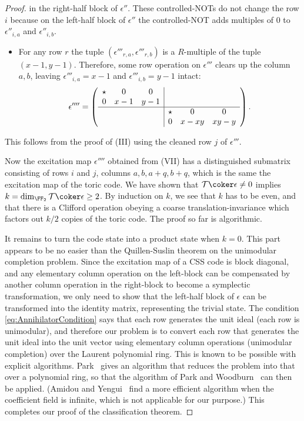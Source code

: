 \begin{proof}
in the right-half block of $\epsilon''$.
These controlled-NOTs do not change the row $i$ because on the left-half block of $\epsilon''$
the controlled-NOT adds multiples of 0 to $\epsilon''_{i,a}$ and $\epsilon''_{i,b}$.
\begin{itemize}
 \item [(VII)] For any row $r$ the tuple $(\epsilon'''_{r,a},\epsilon'''_{r,b})$ is a $R$-multiple
 of the tuple $(x-1,y-1)$. Therefore, some row operation on $\epsilon'''$ clears up the column $a,b$,
 leaving $\epsilon'''_{i,a} = x-1$ and $\epsilon'''_{i,b} = y-1$ intact:
 \begin{align}
\epsilon'''' = \left(\begin{array}{ccc|ccc}
\star & 0 &  0 &&&\\
0 & x-1  & y-1 & &&\\
\hline
&&& \star&0& 0\\
&&&  0& x-xy & xy-y \\
\end{array}\right).
\end{align}
\end{itemize}
This follows from the proof of (III) using the cleaned row $j$ of $\epsilon'''$.

Now the excitation map $\epsilon''''$ obtained from (VII) has a distinguished submatrix
consisting of rows $i$ and $j$, columns $a,b,a+q,b+q$, which is the same the excitation map of the toric code.
We have shown that $\mathcal T \coker \epsilon \neq 0$ implies $k = \dim_{\FF_2} \mathcal T \coker \epsilon \ge 2$.
By induction on $k$,
we see that $k$ has to be even,
and that there is a Clifford operation obeying a coarse translation-invariance
which factors out $k/2$ copies of the toric code.
The proof so far is algorithmic.

It remains to turn the code state into a product state when $k = 0$.
This part appears to be no easier than the Quillen-Suslin theorem
on the unimodular completion problem.
Since the excitation map of a CSS code is block diagonal,
and any elementary column operation on the left-block can be compensated
by another column operation in the right-block to become a symplectic transformation,
we only need to show that the left-half block of $\epsilon$ can be transformed into 
the identity matrix, representing the trivial state.
The condition \eqref{eq:AnnihilatorCondition} says that
each row generates the unit ideal (each row is unimodular),
and therefore our problem is
to convert each row that generates the unit ideal into the unit vector
using elementary column operations (unimodular completion)
over the Laurent polynomial ring.
This is known to be possible with explicit algorithms.
Park~\cite{Park2004Symbolic} gives an algorithm that reduces the problem into that over a polynomial ring,
so that the algorithm of Park and Woodburn~\cite{ParkWoodburn1995Algorithmic} can then be applied.
(Amidou and Yengui~\cite{AmidouYengui2008algorithm} find a more efficient algorithm
when the coefficient field is infinite, which is not applicable for our purpose.)
This completes our proof of the classification theorem.
\end{proof}


